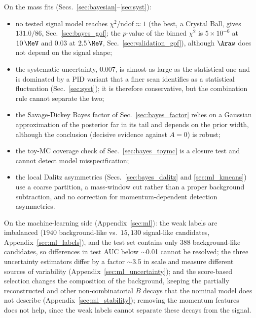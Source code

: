 On the mass fits (Secs.~\ref{sec:bayesian}--\ref{sec:syst}):
\begin{itemize}[leftmargin=*,itemsep=2pt]
\item no tested signal model reaches $\chi^2/\mathrm{ndof}\approx1$ (the best, a Crystal Ball, gives $131.0/86$, Sec.~\ref{sec:bayes_gof}; the $p$-value of the binned $\chi^2$ is $5\times10^{-6}$ at $10\,\MeV$ and $0.03$ at $2.5\,\MeV$, Sec.~\ref{sec:validation_gof}), although $\Araw$ does not depend on the signal shape;
\item the systematic uncertainty, $0.007$, is almost as large as the statistical one and is dominated by a PID variant that a finer scan identifies as a statistical fluctuation (Sec.~\ref{sec:syst}); it is therefore conservative, but the combination rule cannot separate the two;
\item the Savage-Dickey Bayes factor of Sec.~\ref{sec:bayes_factor} relies on a Gaussian approximation of the posterior far in its tail and depends on the prior width, although the conclusion (decisive evidence against $A=0$) is robust;
\item the toy-MC coverage check of Sec.~\ref{sec:bayes_toymc} is a closure test and cannot detect model misspecification;
\item the local Dalitz asymmetries (Secs.~\ref{sec:bayes_dalitz} and \ref{sec:ml_kmeans}) use a coarse partition, a mass-window cut rather than a proper background subtraction, and no correction for momentum-dependent detection asymmetries.
\end{itemize}

On the machine-learning side (Appendix~\ref{sec:ml}): the weak labels are imbalanced ($1940$ background-like vs.\ $15{,}130$ signal-like candidates, Appendix~\ref{sec:ml_labels}), and the test set contains only $388$ background-like candidates, so differences in test AUC below $\sim$0.01 cannot be resolved; the three uncertainty estimators differ by a factor $\sim$3.5 in scale and measure different sources of variability (Appendix~\ref{sec:ml_uncertainty}); and the score-based selection changes the composition of the background, keeping the partially reconstructed and other non-combinatorial $B$ decays that the nominal model does not describe (Appendix~\ref{sec:ml_stability}); removing the momentum features does not help, since the weak labels cannot separate these decays from the signal.

